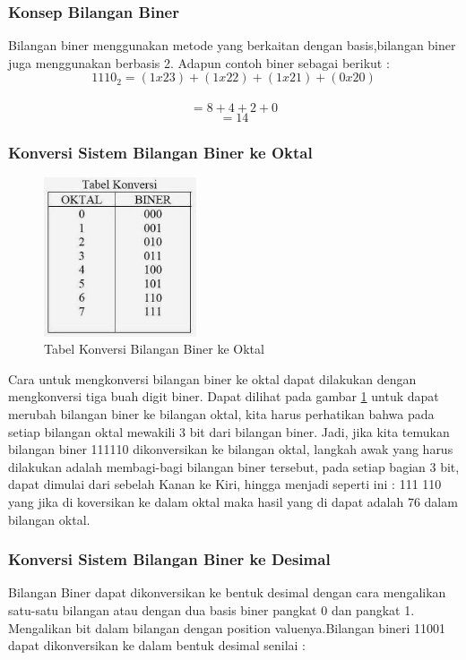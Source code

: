 \subsubsection{Konsep Bilangan Biner}
Bilangan biner menggunakan metode yang berkaitan dengan basis,bilangan biner juga menggunakan berbasis 2. Adapun contoh biner sebagai berikut : \\
\begin{equation} 1110_{2} = (1x23)+(1x22)+(1x21)+(0x20) \end{equation}\\
\begin{equation} = 8+4+2+0\end{equation}
\begin{equation}= 14 \end{equation}

\subsubsection{Konversi Sistem Bilangan Biner ke Oktal}
\begin{figure}[ht]
\centerline{\includegraphics[width=0.4\textwidth]{figures/konversioktal.jpg}}
\caption{Tabel Konversi Bilangan Biner ke Oktal}
\label{konversioktal}
\end{figure}
\break
Cara untuk mengkonversi bilangan biner ke oktal dapat dilakukan dengan mengkonversi tiga buah digit biner. Dapat dilihat pada gambar \ref{konversioktal} untuk dapat merubah bilangan biner ke bilangan oktal, kita harus perhatikan bahwa pada setiap bilangan oktal mewakili 3 bit dari bilangan biner. Jadi, jika kita temukan bilangan biner 111110 dikonversikan ke bilangan oktal, langkah awak yang harus dilakukan adalah membagi-bagi bilangan biner tersebut, pada setiap bagian 3 bit, dapat dimulai dari sebelah Kanan ke Kiri, hingga menjadi seperti ini : 111 110 yang jika di koversikan ke dalam oktal maka hasil yang di dapat adalah 76 dalam bilangan oktal.

\subsubsection{Konversi Sistem Bilangan Biner ke Desimal}
Bilangan Biner dapat dikonversikan ke bentuk desimal dengan cara mengalikan satu-satu bilangan atau dengan dua basis biner pangkat 0 dan pangkat 1. Mengalikan bit dalam bilangan dengan position valuenya.Bilangan bineri 11001 dapat dikonversikan ke dalam bentuk desimal senilai : \\

